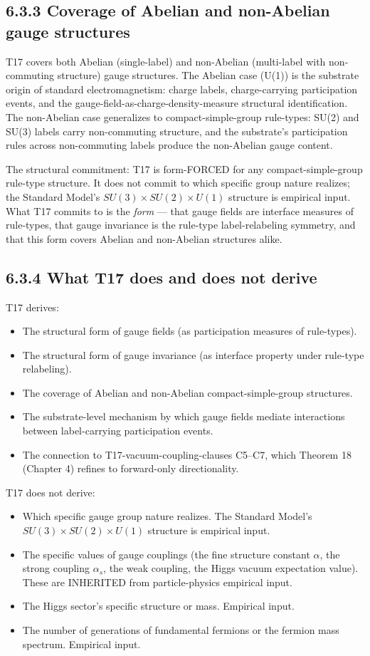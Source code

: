 \documentclass[11pt]{book}
\begin{document}
\subsection{6.3.3 Coverage of Abelian and non-Abelian gauge structures}

T17 covers both Abelian (single-label) and non-Abelian (multi-label with non-commuting structure) gauge structures. The Abelian case (U(1)) is the substrate origin of standard electromagnetism: charge labels, charge-carrying participation events, and the gauge-field-as-charge-density-measure structural identification. The non-Abelian case generalizes to compact-simple-group rule-types: SU(2) and SU(3) labels carry non-commuting structure, and the substrate's participation rules across non-commuting labels produce the non-Abelian gauge content.

The structural commitment: T17 is form-FORCED for any compact-simple-group rule-type structure. It does not commit to which specific group nature realizes; the Standard Model's $SU(3) \times SU(2) \times U(1)$ structure is empirical input. What T17 commits to is the \textit{form} — that gauge fields are interface measures of rule-types, that gauge invariance is the rule-type label-relabeling symmetry, and that this form covers Abelian and non-Abelian structures alike.

\subsection{6.3.4 What T17 does and does not derive}

T17 derives:
\begin{itemize}
\item The structural form of gauge fields (as participation measures of rule-types).
\item The structural form of gauge invariance (as interface property under rule-type relabeling).
\item The coverage of Abelian and non-Abelian compact-simple-group structures.
\item The substrate-level mechanism by which gauge fields mediate interactions between label-carrying participation events.
\item The connection to T17-vacuum-coupling-clauses C5–C7, which Theorem 18 (Chapter 4) refines to forward-only directionality.
\end{itemize}

T17 does not derive:
\begin{itemize}
\item Which specific gauge group nature realizes. The Standard Model's $SU(3) \times SU(2) \times U(1)$ structure is empirical input.
\item The specific values of gauge couplings (the fine structure constant $\alpha$, the strong coupling $\alpha_s$, the weak coupling, the Higgs vacuum expectation value). These are INHERITED from particle-physics empirical input.
\item The Higgs sector's specific structure or mass. Empirical input.
\item The number of generations of fundamental fermions or the fermion mass spectrum. Empirical input.
\end{itemize}
\end{document}
